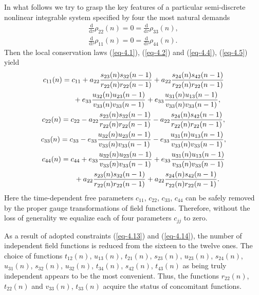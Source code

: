 \documentclass[10pt,a4paper]{amsart}
\numberwithin{equation}{section}
\begin{document}
In what follows we try to grasp the key features of a particular semi-discrete nonlinear integrable system specified by four the most natural demands
\begin{gather}\label{eq-4.13}
	\frac{\mathrm{d}}{\mathrm{d}\tau}\rho_{22}(n)=0=\frac{\mathrm{d}}{\mathrm{d}\tau}\rho_{33}(n),
\\ \label{eq-4.14}
	\frac{\mathrm{d}}{\mathrm{d}\tau}\rho_{11}(n)=0=\frac{\mathrm{d}}{\mathrm{d}\tau}\rho_{44}(n) .
\end{gather}
Then the local conservation laws (\ref{eq-4.1}), (\ref{eq-4.2}) and (\ref{eq-4.4}), (\ref{eq-4.5}) yield
\begin{gather}
	c_{11}(n)=c_{11}+a_{22}\frac{s_{23}(n)s_{32}(n-1)}{r_{22}(n)r_{22}(n-1)}+ a_{22}\frac{s_{24}(n)s_{42}(n-1)}{r_{22}(n)r_{22}(n-1)}\nonumber\\
\hphantom{c_{11}(n)=}{}
+e_{33}\frac{u_{32}(n)u_{23}(n-1)}{v_{33}(n)v_{33}(n-1)}+ e_{33}\frac{u_{31}(n)u_{13}(n-1)}{v_{33}(n)v_{33}(n-1)},\label{eq-4.15}
\\
	c_{22}(n)=c_{22}-a_{22}\frac{s_{23}(n)s_{32}(n-1)}{r_{22}(n)r_{22}(n-1)}- a_{22}\frac{s_{24}(n)s_{42}(n-1)}{r_{22}(n)r_{22}(n-1)}, \label{eq-4.16}
\\
 c_{33}(n)=c_{33}-e_{33}\frac{u_{32}(n)u_{23}(n-1)}{v_{33}(n)v_{33}(n-1)}- e_{33}\frac{u_{31}(n)u_{13}(n-1)}{v_{33}(n)v_{33}(n-1)}, \label{eq-4.17}
\\
	c_{44}(n)=c_{44}+e_{33}\frac{u_{32}(n)u_{23}(n-1)}{v_{33}(n)v_{33}(n-1)}+ e_{33}\frac{u_{31}(n)u_{13}(n-1)}{v_{33}(n)v_{33}(n-1)}\nonumber\\
\hphantom{c_{44}(n)=}{}
	+a_{22}\frac{s_{23}(n)s_{32}(n-1)}{r_{22}(n)r_{22}(n-1)}+ a_{22}\frac{s_{24}(n)s_{42}(n-1)}{r_{22}(n)r_{22}(n-1)} . \label{eq-4.18}
\end{gather}
Here the time-dependent free parameters $c_{11}$, $c_{22}$, $c_{33}$, $c_{44}$ can be safely removed by the proper gauge transformations of field functions. Therefore, without the loss of generality we equalize each of four parameters $c_{jj}$ to zero.

As a result of adopted constraints (\ref{eq-4.13}) and (\ref{eq-4.14}), the number of independent field functions is reduced from the sixteen to the twelve ones. The choice of functions $t_{12}(n)$, $u_{13}(n)$, $t_{21}(n)$, $s_{23}(n)$, $u_{23}(n)$, $s_{24}(n)$, $u_{31}(n)$, $s_{32}(n)$, $u_{32}(n)$, $t_{34}(n)$, $s_{42}(n)$, $t_{43}(n)$ as being truly independent appears to be the most convenient. Thus, the functions $r_{22}(n)$, $t_{22}(n)$ and $v_{33}(n)$, $t_{33}(n)$ acquire the status of concomitant functions.
\end{document}
